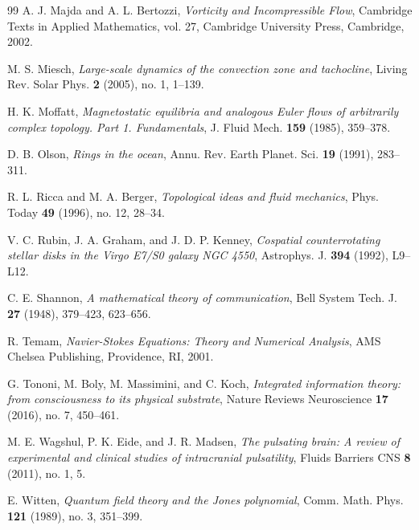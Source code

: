 \documentclass[12pt]{article}
\begin{document}
\begin{thebibliography}{99}
 A. J. Majda and A. L. Bertozzi, \emph{Vorticity and Incompressible Flow}, Cambridge Texts in Applied Mathematics, vol. 27, Cambridge University Press, Cambridge, 2002.

 M. S. Miesch, \emph{Large-scale dynamics of the convection zone and tachocline}, Living Rev. Solar Phys. \textbf{2} (2005), no. 1, 1--139.

 H. K. Moffatt, \emph{Magnetostatic equilibria and analogous Euler flows of arbitrarily complex topology. Part 1. Fundamentals}, J. Fluid Mech. \textbf{159} (1985), 359--378.

 D. B. Olson, \emph{Rings in the ocean}, Annu. Rev. Earth Planet. Sci. \textbf{19} (1991), 283--311.

 R. L. Ricca and M. A. Berger, \emph{Topological ideas and fluid mechanics}, Phys. Today \textbf{49} (1996), no. 12, 28--34.

 V. C. Rubin, J. A. Graham, and J. D. P. Kenney, \emph{Cospatial counterrotating stellar disks in the Virgo E7/S0 galaxy NGC 4550}, Astrophys. J. \textbf{394} (1992), L9--L12.

 C. E. Shannon, \emph{A mathematical theory of communication}, Bell System Tech. J. \textbf{27} (1948), 379--423, 623--656.

 R. Temam, \emph{Navier-Stokes Equations: Theory and Numerical Analysis}, AMS Chelsea Publishing, Providence, RI, 2001.

 G. Tononi, M. Boly, M. Massimini, and C. Koch, \emph{Integrated information theory: from consciousness to its physical substrate}, Nature Reviews Neuroscience \textbf{17} (2016), no. 7, 450--461.

 M. E. Wagshul, P. K. Eide, and J. R. Madsen, \emph{The pulsating brain: A review of experimental and clinical studies of intracranial pulsatility}, Fluids Barriers CNS \textbf{8} (2011), no. 1, 5.

 E. Witten, \emph{Quantum field theory and the Jones polynomial}, Comm. Math. Phys. \textbf{121} (1989), no. 3, 351--399.

\end{thebibliography}
\end{document}
